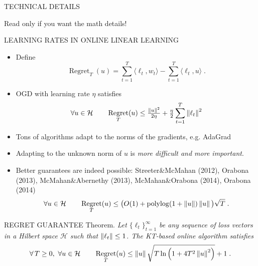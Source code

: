\documentclass[final,t,serif,mathserif]{beamer}
\renewcommand{\H}{\mathcal{H}}  %
\DeclareMathOperator{\Regret}{Regret}
\DeclareMathOperator{\polylog}{polylog}
\def\spaziooo{\vspace{-0.cm}}
\begin{document}
\begin{frame}{}
\begin{columns}[t]
\begin{column}{.33\linewidth}

    \begin{block}{TECHNICAL DETAILS}
    \begin{minipage}{.98\linewidth}

    Read only if you want the math details!

    \begin{block}{LEARNING RATES IN ONLINE LINEAR LEARNING}
    \begin{itemize}
      \item Define
      \[
        \Regret_T(u) = \sum_{t=1}^T \langle \ell_t, w_t \rangle - \sum_{t=1}^T \langle \ell_t, u \rangle  \; .
      \]
      \item OGD with learning rate $\eta$ satisfies
	\[
	\forall u \in \H \qquad \Regret_T(u) \le \tfrac{\norm{u}^2}{2\eta} + \tfrac{\eta}{2} \sum_{t=1}^T \norm{\ell_t}^2
	\]
      \item Tons of algorithms adapt to the norms of the gradients, e.g. AdaGrad
      \item Adapting to the unknown norm of $u$ is \emph{more difficult and more important}.
      \item Better guarantees are indeed possible: Streeter\&McMahan (2012), Orabona (2013), McMahan\&Abernethy (2013), McMahan\&Orabona (2014), Orabona (2014) 
	\[
	\forall u \in \H \qquad \Regret_T(u) \le \big(O(1)+\polylog(1 + \norm{u})\norm{u} \big) \sqrt{T} \; .
	\]
    \end{itemize}
    \end{block}

    \begin{block}{REGRET GUARANTEE}
    \spaziooo
    \alert{Theorem.} \emph{
	Let $\{\ell_t\}_{t=1}^\infty$ be any sequence of loss vectors
	in a Hilbert space $\H$ such that $\left\|{\ell_t}\right\| \le 1$.
	The KT-based online algorithm satisfies
	$$
	\forall \, T \ge 0, \
	\forall u \in \H \qquad
	\Regret_T(u) \le \norm{u} \sqrt{T \ln\left(1 + 4T^2 \norm{u}^2 \right)} + 1 \;.
	$$
    }

    \vspace{1cm}


\end{block}
\end{minipage}
\end{block}
\end{column}
\end{columns}
\end{frame}
\end{document}
